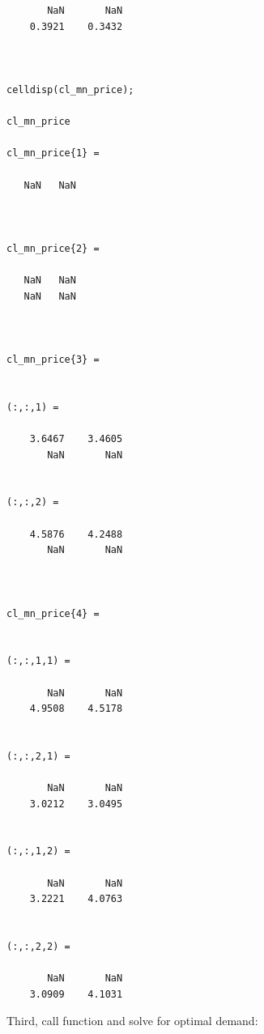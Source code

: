 \documentclass[
]{book}
\begin{document}
\begin{verbatim}
       NaN       NaN
    0.3921    0.3432



celldisp(cl_mn_price);

cl_mn_price
 
cl_mn_price{1} =
 
   NaN   NaN



cl_mn_price{2} =
 
   NaN   NaN
   NaN   NaN



cl_mn_price{3} =
 

(:,:,1) =

    3.6467    3.4605
       NaN       NaN


(:,:,2) =

    4.5876    4.2488
       NaN       NaN



cl_mn_price{4} =
 

(:,:,1,1) =

       NaN       NaN
    4.9508    4.5178


(:,:,2,1) =

       NaN       NaN
    3.0212    3.0495


(:,:,1,2) =

       NaN       NaN
    3.2221    4.0763


(:,:,2,2) =

       NaN       NaN
    3.0909    4.1031
\end{verbatim}

Third, call function and solve for optimal demand:
\end{document}
